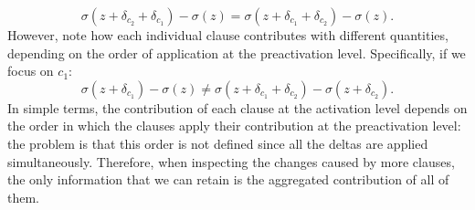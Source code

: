 \begin{equation*}
\sigma(z + \delta_{c_2} + \delta_{c_1}) - \sigma(z) = \sigma(z + \delta_{c_1} + \delta_{c_2}) - \sigma(z).
\end{equation*}
However, note how each individual clause contributes with different quantities, depending on the order of application at the preactivation level. Specifically, if we focus on $c_1$:
\begin{equation*}
\sigma(z + \delta_{c_1}) - \sigma(z) \neq \sigma(z + \delta_{c_1} + \delta_{c_2}) - \sigma(z + \delta_{c_2}).
\end{equation*}
In simple terms, the contribution of each clause at the activation level depends on the order in which the clauses apply their contribution at the preactivation level: the problem is that this order is not defined since all the deltas are applied simultaneously. Therefore, when inspecting the changes caused by more clauses, the only information that we can retain is the aggregated contribution of all of them.

